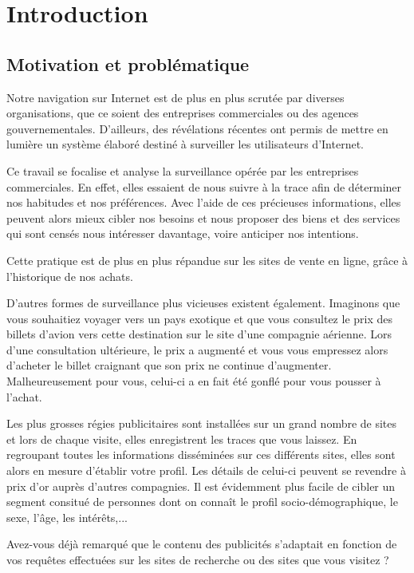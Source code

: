 \chapter{Introduction}
\section{Motivation et problématique}
Notre navigation sur Internet est de plus en plus scrutée par diverses organisations, que ce soient des entreprises commerciales ou des agences gouvernementales. D'ailleurs, des révélations récentes \cite{WikipediaFR_RES} ont permis de mettre en lumière un système élaboré destiné à surveiller les utilisateurs d'Internet.

Ce travail se focalise et analyse la surveillance opérée par les entreprises commerciales. En effet, elles essaient de nous suivre à la trace afin de déterminer nos habitudes et nos préférences. Avec l'aide de ces précieuses informations, elles peuvent alors mieux cibler nos besoins et nous proposer des biens et des services qui sont censés nous intéresser davantage, voire anticiper nos intentions\cite{MD1}.

Cette pratique est de plus en plus répandue sur les sites de vente en ligne, grâce à l'historique de nos achats.

D'autres formes de surveillance plus vicieuses existent également. Imaginons que vous souhaitiez voyager vers un pays exotique et que vous consultez le prix des billets d'avion vers cette destination sur le site d'une compagnie aérienne. Lors d'une consultation ultérieure, le prix a augmenté et vous vous empressez alors d'acheter le billet craignant que son prix ne continue d'augmenter. Malheureusement pour vous, celui-ci a en fait été gonflé pour vous pousser à l'achat.

Les plus grosses régies publicitaires sont installées sur un grand nombre de sites et lors de chaque visite, elles enregistrent les traces que vous laissez. En regroupant toutes les informations disséminées sur ces différents sites, elles sont alors en mesure d'établir votre profil. Les détails de celui-ci peuvent se revendre à prix d'or auprès d'autres compagnies. Il est évidemment plus facile de cibler un segment consitué de personnes dont on connaît le profil socio-démographique, le sexe, l'âge, les intérêts,...

Avez-vous déjà remarqué que le contenu des publicités s'adaptait en fonction de vos requêtes effectuées sur les sites de recherche ou des sites que vous visitez ?


